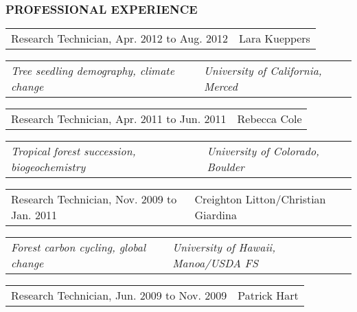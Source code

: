 \documentclass[11pt,english]{article}
\providecommand{\tabularnewline}{\\}
\begin{document}

\subsubsection*{PROFESSIONAL EXPERIENCE}
\vspace{-0.5ex}

\begin{tabular}{>{\raggedright}p{3.25in}>{\raggedleft}p{2.75in}}
Research Technician, Apr. 2012 to Aug. 2012 & Lara Kueppers \tabularnewline
\end{tabular}

\begin{tabular}{>{\raggedright}p{3.25in}>{\raggedleft}p{2.75in}}
\hspace{1.5em}\emph{Tree seedling demography, climate change} & \emph{University of California, Merced} %
\end{tabular}
\vspace{-2ex}

\begin{tabular}{>{\raggedright}p{3.25in}>{\raggedleft}p{2.75in}}
Research Technician, Apr. 2011 to Jun. 2011 & Rebecca Cole\tabularnewline
\end{tabular}

\begin{tabular}{>{\raggedright}p{3.25in}>{\raggedleft}p{=2.75in}}
\hspace{1.5em}\emph{Tropical forest succession, biogeochemistry} & \emph{University of Colorado, Boulder}\tabularnewline
\end{tabular}
\vspace{-2ex}

\begin{tabular}{>{\raggedright}p{3.25in}>{\raggedleft}p{2.75in}}
Research Technician, Nov. 2009 to Jan. 2011 & Creighton Litton/Christian Giardina\tabularnewline
\end{tabular}

\begin{tabular}{>{\raggedright}p{3.25in}>{\raggedleft}p{2.75in}}
\hspace{1.5em}\emph{Forest carbon cycling, global change} & \emph{University of Hawaii, Manoa/USDA FS}\tabularnewline
\end{tabular}
\vspace{-2ex}

\begin{tabular}{>{\raggedright}p{3.25in}>{\raggedleft}p{2.75in}}
Research Technician, Jun. 2009 to Nov. 2009 & Patrick Hart\tabularnewline
\end{tabular}
\end{document}
